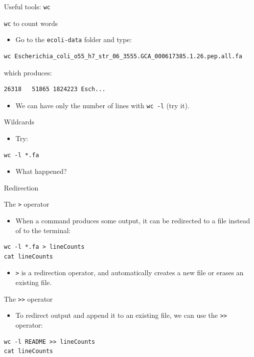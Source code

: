 \documentclass[big]{beamer}
\begin{document}
\begin{frame}[fragile,label=sec-3-1]{Useful tools: \texttt{wc}}
 \begin{block}{\texttt{wc} to count words}
\begin{itemize}
\item Go to the \texttt{ecoli-data} folder and type:
\end{itemize}
\begin{verbatim}
wc Escherichia_coli_o55_h7_str_06_3555.GCA_000617385.1.26.pep.all.fa
\end{verbatim}
which produces:
\begin{verbatim}
26318   51865 1824223 Esch...
\end{verbatim}
\begin{itemize}
\item We can have only the number of lines with \texttt{wc -l} (try it).
\end{itemize}
\end{block}
\begin{block}{Wildcards}
\begin{itemize}
\item Try:
\end{itemize}
\begin{verbatim}
wc -l *.fa
\end{verbatim}
\begin{itemize}
\item What happened?
\end{itemize}
\end{block}
\end{frame}
\begin{frame}[fragile,label=sec-3-2]{Redirection}
 \begin{block}{The \texttt{>} operator}
\begin{itemize}
\item When a command produces some output, it can be redirected to a file instead
of to the terminal:
\end{itemize}
\begin{verbatim}
wc -l *.fa > lineCounts
cat lineCounts
\end{verbatim}
\begin{itemize}
\item \texttt{>} is a \alert{redirection} operator, and automatically creates a new file or
erases an existing file.
\end{itemize}
\end{block}
\begin{block}{The \texttt{>>} operator}
\begin{itemize}
\item To redirect output and append it to an existing file, we can use the \texttt{>>}
operator:
\end{itemize}
\begin{verbatim}
wc -l README >> lineCounts
cat lineCounts
\end{verbatim}
\end{block}
\end{frame}
\end{document}
